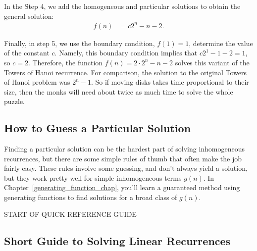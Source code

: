 In the Step 4, we add the homogeneous and particular solutions to
obtain the general solution:
\begin{align*}
f(n) & = c 2^n - n - 2.
\end{align*}

Finally, in step 5, we use the boundary condition, $f(1) = 1$,
determine the value of the constant $c$.  Namely, this boundary
condition implies that $c 2^1 - 1 - 2 = 1$, so $c=2$.
Therefore, the function $f(n) = 2 \cdot 2^n - n - 2$ solves this
variant of the Towers of Hanoi recurrence.  For comparison, the
solution to the original Towers of Hanoi problem was $2^n - 1$.  So if
moving disks takes time proportional to their size, then the monks
will need about twice as much time to solve the whole puzzle.

\subsection{How to Guess a Particular Solution}


Finding a particular solution can be the hardest part of solving
inhomogeneous recurrences, but there are some simple rules of thumb
that often make the job fairly easy.  These rules involve some
guessing, and don't always yield a solution, but they work pretty well
for simple inhomogeneous terms $g(n)$.  In
Chapter~\ref{generating_function_chap}, you'll learn a guaranteed
method using generating functions to find solutions for a broad class
of $g(n)$.


\begin{center}
START OF QUICK REFERENCE GUIDE
\end{center}

\begin{center}
\subsection*{Short Guide to Solving Linear Recurrences}
\end{center}

